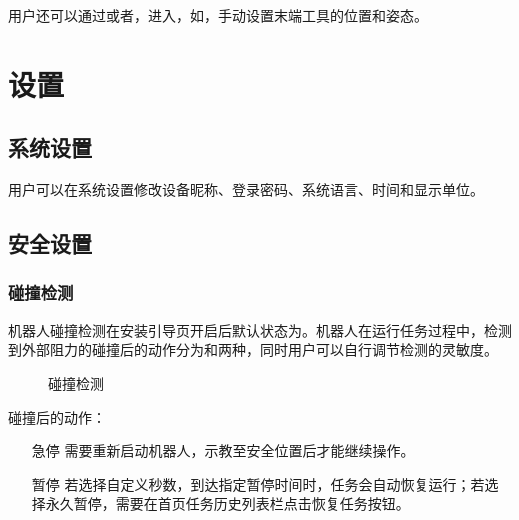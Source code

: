 用户还可以通过或者，进入，如，手动设置末端工具的位置和姿态。

\section{设置}

\subsection{系统设置}

用户可以在系统设置修改设备昵称、登录密码、系统语言、时间和显示单位。

\subsection{安全设置}
\subsubsection{碰撞检测}
机器人碰撞检测在安装引导页开启后默认状态为。机器人在运行任务过程中，检测到外部阻力的碰撞后的动作分为和两种，同时用户可以自行调节检测的灵敏度。

\begin{figure}[htb]
	\centering

	\caption{碰撞检测}
	\label{fig:碰撞检测设置}
\end{figure}

碰撞后的动作：
\begin{itemize}
	\item[急停] 需要重新启动机器人，示教至安全位置后才能继续操作。
	\item[暂停] 若选择自定义秒数，到达指定暂停时间时，任务会自动恢复运行；若选择永久暂停，需要在首页任务历史列表栏点击恢复任务按钮。
\end{itemize}

